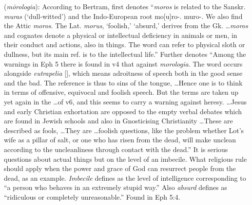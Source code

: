 \item[Absurd speech,]

(\textit{mōrologia}):
According to Bertram,  first denotes ``\emph{moros} is related to the Sanskr. \emph{muras} (`dull-witted') and the Indo-European root mo[u]ro-. muro-. We also find the Attic \emph{moros}. The Lat. \emph{morus}, `foolish,' `absurd,' derives from the Gk. \ldots \emph{moros} and cognates denote a physical or intellectual deficiency in animals or men, in their conduct and actions, also in things. The word can refer to physical sloth or dullness, but its main ref. is to the intellectual life.''
Further  denotes ``Among the warnings in Eph 5 there is found in v4 that against \emph{morologia}. The word occurs alongside \emph{eutrapelia} [], which means adroitness of speech both in the good sense and the bad. The reference is thus to sins of the tongue, \ldots Hence one is to think in terms of offensive, equivocal and foolish speech. But the terms are taken up yet again in the \ldots of v6, and this seems to carry a warning against heresy. \ldots Jesus and early Christian exhortation are opposed to the empty verbal debates which are found in Jewish schools and also in Gnosticising Christianity \ldots These are described as fools, \ldots They are \ldots foolish questions, like the problem whether Lot's wife as a pillar of salt, or one who has risen from the dead, will make unclean according to the uncleanliness through contact with the dead.''
It is serious questions about actual things but on the level of an imbecile. What religious rule should apply when the power and grace of God can resurrect people from the dead, as an example. \emph{Imbecile} defines as the level of intelligence corresponding to ``a person who behaves in an extremely stupid way.'' Also \emph{absurd} defines as ``ridiculous or completely unreasonable.''
Found in Eph 5:4.

